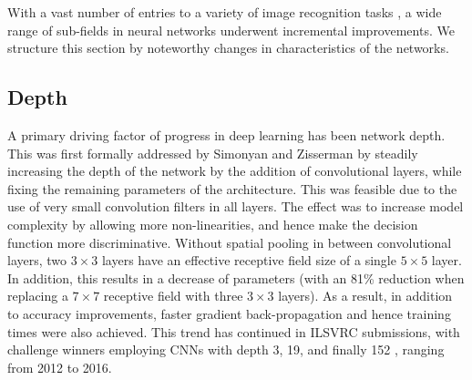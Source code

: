 \documentclass[12pt]{llncs}
\begin{document}
With a vast number of entries to a variety of image recognition tasks \cite{russakovsky2014imagenet,ILSVRC15}, a wide range of sub-fields in neural networks underwent incremental improvements. We structure this section by noteworthy changes in characteristics of the networks.

\subsection{Depth}
A primary driving factor of progress in deep learning has been network depth. This was first formally addressed by Simonyan and Zisserman \cite{simonyan2014very} by steadily increasing the depth of the network by the addition of convolutional layers, while fixing the remaining parameters of the architecture. This was feasible due to the use of very small convolution filters in all layers. The effect was to increase model complexity by allowing more non-linearities, and hence make the decision function more discriminative. Without spatial pooling in between convolutional layers, two $3 \times 3$ layers have an effective receptive field size of a single $5 \times 5$ layer. In addition, this results in a decrease of parameters (with an 81\% reduction when replacing a $7 \times 7$ receptive field with three $3\times3$ layers). As a result, in addition to accuracy improvements, faster gradient back-propagation and hence training times were also achieved. This trend has continued in ILSVRC submissions, with challenge winners employing CNNs with depth 3, 19, and finally 152 \cite{krizhevsky2012imagenet,simonyan2014very,he2016deep}, ranging from 2012 to 2016.
\end{document}
